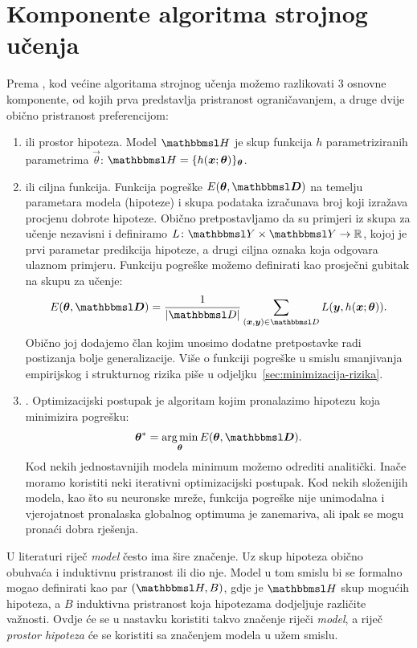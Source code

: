\documentclass[utf8, diplomski, lmodern]{fer}
\begin{document}
\section{Komponente algoritma strojnog učenja}

Prema \citet{Snajder:2014:SU}, kod većine algoritama strojnog učenja možemo razlikovati $3$ osnovne komponente, od kojih prva predstavlja pristranost ograničavanjem, a druge dvije obično pristranost preferencijom:
\begin{enumerate}
	\item {} ili prostor hipoteza. Model $\set H$ je skup funkcija $h$  parametriziranih parametrima $\vec\theta$: $\set H=\cbr{h(\vec x;\vec{\theta})}_{\vec{\theta}}$.
	\item {} ili ciljna funkcija. Funkcija pogreške $E(\vec{\theta,\set D})$ na temelju parametara modela (hipoteze) i skupa podataka izračunava broj koji izražava procjenu dobrote hipoteze. Obično pretpostavljamo da su primjeri iz skupa za učenje nezavisni i definiramo  $\funcdef{L}{\set Y\times\set Y}{\R}$, kojoj je prvi parametar predikcija hipoteze, a drugi ciljna oznaka koja odgovara ulaznom primjeru. Funkciju pogreške možemo definirati kao prosječni gubitak na skupu za učenje:
	\begin{align}
	E(\vec{\theta,\set D})=\frac{1}{\envert{\set D}}\sum_{(\vec x,\vec y)\in\set D} L(\vec y,h(\vec x;\vec{\theta})) \text{.}
	\end{align}
	Obično joj dodajemo  član kojim unosimo dodatne pretpostavke radi postizanja bolje generalizacije. Više o funkciji pogreške u smislu smanjivanja empirijskog i strukturnog rizika piše u odjeljku~\ref{sec:minimizacija-rizika}.
	\item {}. Optimizacijski postupak je algoritam kojim pronalazimo hipotezu koja minimizira pogrešku:
	\begin{align}
	\vec\theta^* = \argmin_{\vec{\theta}} E(\vec{\theta,\set D}) \text{.}
	\end{align}
	Kod nekih jednostavnijih modela minimum možemo odrediti analitički. Inače moramo koristiti neki iterativni optimizacijski postupak. Kod nekih složenijih modela, kao što su neuronske mreže, funkcija pogreške nije unimodalna i vjerojatnost pronalaska globalnog optimuma je zanemariva, ali ipak se mogu pronaći dobra rješenja.
\end{enumerate}

U literaturi riječ \textit{model} često ima šire značenje. Uz skup hipoteza obično obuhvaća i induktivnu pristranost ili dio nje. Model u tom smislu bi se formalno mogao definirati kao par $(\set H, B)$, gdje je $\set H$ skup mogućih hipoteza, a $B$ induktivna pristranost koja hipotezama dodjeljuje različite važnosti. Ovdje će se u nastavku koristiti takvo značenje riječi \textit{model}, a riječ \textit{prostor hipoteza} će se koristiti sa značenjem modela u užem smislu.
\end{document}
